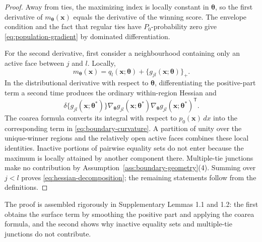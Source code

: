 \begin{proof}
Away from ties, the maximizing index is locally constant in $\boldsymbol{\theta}$, so the
first derivative of $m_{\boldsymbol{\theta}}(\mathbf{x})$ equals the derivative of the winning score.
The envelope condition and the fact that regular ties have $P_0$-probability
zero give \eqref{eq:population-gradient} by dominated differentiation.

For the second derivative, first consider a neighbourhood containing only an
active face between $j$ and $l$.  Locally,
\[
 m_{\boldsymbol{\theta}}(\mathbf{x})=q_l(\mathbf{x};\boldsymbol{\theta})+\{g_{jl}(\mathbf{x};\boldsymbol{\theta})\}_+.
\]
In the distributional derivative with respect to $\boldsymbol{\theta}$, differentiating
the positive-part term a second time produces the ordinary within-region
Hessian and
\[
 \delta\{g_{jl}(\mathbf{x};\boldsymbol{\theta}^*)\}
 \nabla_{\boldsymbol{\theta}}g_{jl}(\mathbf{x};\boldsymbol{\theta}^*)\nabla_{\boldsymbol{\theta}}g_{jl}(\mathbf{x};\boldsymbol{\theta}^*)^\mathsf T.
\]
The coarea formula \citep{evans2015measure} converts its integral with respect to
$p_0(\mathbf{x})\,dx$ into the corresponding term in
\eqref{eq:boundary-curvature}.  A partition of unity over the unique-winner
regions and the relatively open active faces combines these local identities.
Inactive portions of pairwise equality sets do not enter because the maximum
is locally attained by another component there.  Multiple-tie junctions make
no contribution by Assumption~\ref{ass:boundary-geometry}(4).  Summing over
$j<l$ proves \eqref{eq:hessian-decomposition}; the remaining statements follow
from the definitions.
\end{proof}

The proof is assembled rigorously in Supplementary Lemmas 1.1 and 1.2: the first obtains the
surface term by smoothing the positive part and applying the coarea formula,
and the second shows why inactive equality sets and multiple-tie junctions do
not contribute.

